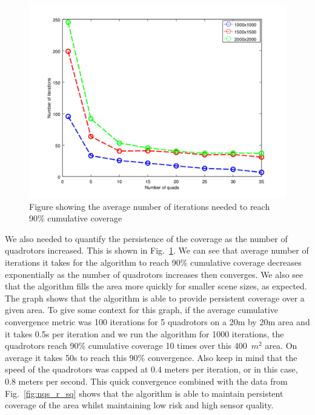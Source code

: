 \documentclass{article}
\begin{document}
\begin{figure}[h!]

    \includegraphics[width=1\columnwidth]{tasefigs/perf_quads.png}

    \caption{Figure showing the average number of iterations needed to reach
        90\% cumulative coverage}

    \label{fig:nqs_cum}

\end{figure}

We also needed to quantify the persistence of the coverage as the number of
quadrotors increased. This is shown in Fig.~\ref{fig:nqs_cum}. We can see that
average number of iterations it takes for the algorithm to reach 90\%
cumulative coverage decreases exponentially as the number of quadrotors
increases then converges. We also see that the algorithm fills the area more
quickly for smaller scene sizes, as expected. The graph shows that the
algorithm is able to provide persistent coverage over a given area. To give
some context for this graph, if the average cumulative convergence metric was
100 iterations for 5 quadrotors on a 20m by 20m area and it takes 0.5s per
iteration and we run the algorithm for 1000 iterations, the quadrotors reach
90\% cumulative coverage 10 times over this 400~$m^2$ area. On average it takes
50s to reach this 90\% convergence. Also keep in mind that the speed of the
quadrotors was capped at 0.4 meters per iteration, or in this case, 0.8 meters
per second. This quick convergence combined with the data from
Fig.~\ref{fig:nqs_r_sq} shows that the algorithm is able to maintain persistent
coverage of the area whilst maintaining low risk and high sensor quality.
\end{document}
